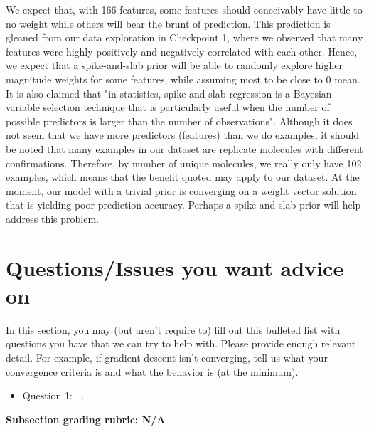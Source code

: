 \documentclass[12pt]{extarticle}
\begin{document}
We expect that, with 166 features, some features should conceivably have little to no weight while others will bear the brunt of prediction. This prediction is gleaned from our data exploration in Checkpoint 1, where we observed that many features were highly positively and negatively correlated with each other. Hence, we expect that a spike-and-slab prior will be able to randomly explore higher magnitude weights for some features, while assuming most to be close to 0 mean. It is also claimed that "in statistics, spike-and-slab regression is a Bayesian variable selection technique that is particularly useful when the number of possible predictors is larger than the number of observations". Although it does not seem that we have more predictors (features) than we do examples, it should be noted that many examples in our dataset are replicate molecules with different confirmations. Therefore, by number of unique molecules, we really only have 102 examples, which means that the benefit quoted may apply to our dataset. At the moment, our model with a trivial prior is converging on a weight vector solution that is yielding poor prediction accuracy. Perhaps a spike-and-slab prior will help address this problem.

\section{Questions/Issues you want advice on}

In this section, you may (but aren't require to) fill out this bulleted list with questions you have that we can try to help with.  Please provide enough relevant detail.  For example, if gradient descent isn't converging, tell us what your convergence criteria is and what the behavior is (at the minimum).

\begin{itemize}
	\item Question 1: ...
\end{itemize}

\textbf{Subsection grading rubric: N/A}
\end{document}
